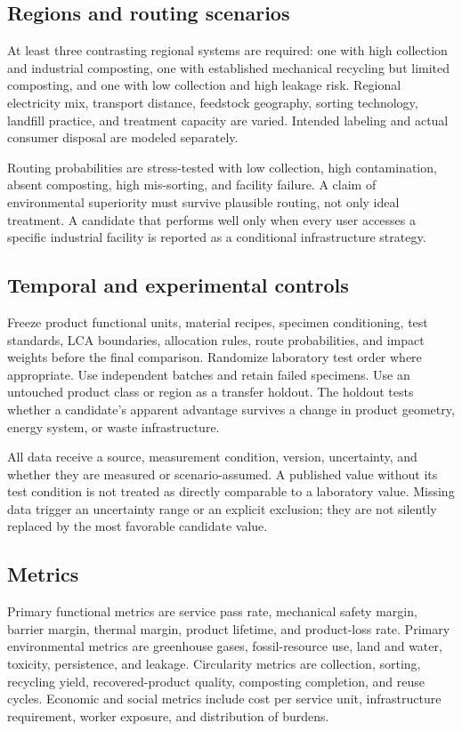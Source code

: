\documentclass[conference]{IEEEtran}
\begin{document}
\subsection{Regions and routing scenarios}

At least three contrasting regional systems are required: one with high collection and industrial composting, one with established mechanical recycling but limited composting, and one with low collection and high leakage risk. Regional electricity mix, transport distance, feedstock geography, sorting technology, landfill practice, and treatment capacity are varied. Intended labeling and actual consumer disposal are modeled separately.

Routing probabilities are stress-tested with low collection, high contamination, absent composting, high mis-sorting, and facility failure. A claim of environmental superiority must survive plausible routing, not only ideal treatment. A candidate that performs well only when every user accesses a specific industrial facility is reported as a conditional infrastructure strategy.

\subsection{Temporal and experimental controls}

Freeze product functional units, material recipes, specimen conditioning, test standards, LCA boundaries, allocation rules, route probabilities, and impact weights before the final comparison. Randomize laboratory test order where appropriate. Use independent batches and retain failed specimens. Use an untouched product class or region as a transfer holdout. The holdout tests whether a candidate's apparent advantage survives a change in product geometry, energy system, or waste infrastructure.

All data receive a source, measurement condition, version, uncertainty, and whether they are measured or scenario-assumed. A published value without its test condition is not treated as directly comparable to a laboratory value. Missing data trigger an uncertainty range or an explicit exclusion; they are not silently replaced by the most favorable candidate value.

\subsection{Metrics}

Primary functional metrics are service pass rate, mechanical safety margin, barrier margin, thermal margin, product lifetime, and product-loss rate. Primary environmental metrics are greenhouse gases, fossil-resource use, land and water, toxicity, persistence, and leakage. Circularity metrics are collection, sorting, recycling yield, recovered-product quality, composting completion, and reuse cycles. Economic and social metrics include cost per service unit, infrastructure requirement, worker exposure, and distribution of burdens.
\end{document}
